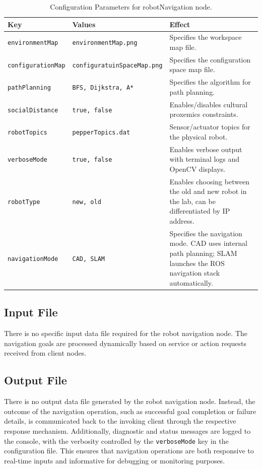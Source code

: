 \documentclass{CSSRforAfrica}
\begin{document}
\begin{table}[H]
\centering
\caption{Configuration Parameters for robotNavigation node.}
\label{tab:robotNavigationConfiguration.ini}
\begin{tabularx}{\textwidth}{|l|l|X|}
\hline
\textbf{Key} & \textbf{Values} & \textbf{Effect} \\ \hline
\verb|environmentMap| & \verb|environmentMap.png| & Specifies the workspace map file. \\ \hline
\verb|configurationMap| & \verb|configuratuinSpaceMap.png| & Specifies the configuration space map file. \\ \hline
\verb|pathPlanning| & \verb|BFS, Dijkstra, A*| & Specifies the algorithm for path planning. \\ \hline
\verb|socialDistance| & \verb|true, false| & Enables/disables cultural proxemics constraints. \\ \hline
\verb|robotTopics| & \verb|pepperTopics.dat| & Sensor/actuator topics for the physical robot. \\ \hline
\verb|verboseMode| & \verb|true, false| & Enables verbose output with terminal logs and OpenCV displays. \\ \hline
\verb|robotType| & \verb|new, old| & Enables choosing between the old and new robot in the lab, can be differentiated by IP address. \\ \hline
\verb|navigationMode| & \verb|CAD, SLAM| & Specifies the navigation mode. CAD uses internal path planning; SLAM launches the ROS navigation stack automatically. \\ \hline
\end{tabularx}
\end{table}


\subsection*{Input File}
There is no specific input data file required for the robot navigation node. The navigation goals are processed dynamically based on service or action requests received from client nodes. 
\subsection*{Output File}
There is no output data file generated by the robot navigation node. Instead, the outcome of the navigation operation, such as successful goal completion or failure details, is communicated back to the invoking client through the respective response mechanism. Additionally, diagnostic and status messages are logged to the console, with the verbosity controlled by the \verb|verboseMode| key in the configuration file. This ensures that navigation operations are both responsive to real-time inputs and informative for debugging or monitoring purposes.
\end{document}
